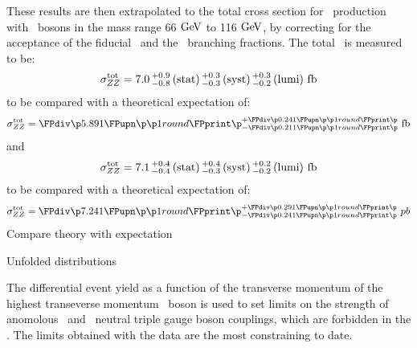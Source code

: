 These results are then extrapolated to the total cross section for \ZZ\
production with \Z\ bosons in the mass range 66$\GeV$ to 116$\GeV$, by
correcting for the acceptance of the fiducial \phasespace\ and the \Zll\
branching fractions. The total \cx\ is measured to be:
\begin{equation}
\sigma_{ZZ}^{\rm tot} = 7.0\, ^{+0.9}_{-0.8}\, \rm{(stat)}\, ^{+0.3}_{-0.3}\, \rm{(syst)}\, ^{+0.3}_{-0.2}\, \rm{(lumi)}~fb
\end{equation}
to be compared with a theoretical expectation of:
\begin{equation}
\sigmaTotZZ = \ZZSevenTeVTheoryTotalCrossSection
\end{equation}
and
\begin{equation}
\sigma_{ZZ}^{\rm tot} = 7.1\, ^{+0.4}_{-0.4}\, \rm{(stat)}\, ^{+0.4}_{-0.3}\, \rm{(syst)}\, ^{+0.2}_{-0.2}\, \rm{(lumi)}~fb
\end{equation}
to be compared with a theoretical expectation of:
\begin{equation}
\sigmaTotZZ = \ZZEightTeVTheoryTotalCrossSection
\end{equation}
Compare theory with expectation

Unfolded distributions

The differential event yield as a function of the transverse momentum of the
highest transeverse momentum \Z\ boson is used to set limits on the strength of
anomolous \ZZZ\ and \ZZg\ neutral triple gauge boson couplings, which are
forbidden in the \sm. 
The limits obtained with the \sqrtseq{8} data are the most constraining to date.
